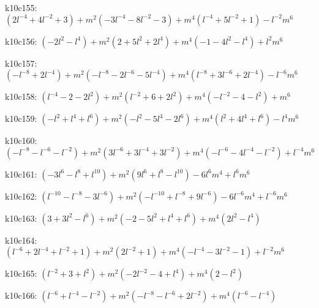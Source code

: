 k10c155: $ (2l^{-4}+4l^{-2}+3)  +m^{2}(-3l^{-4}-8l^{-2}-3)  +m^{4}(l^{-4}+5l^{-2}+1)  -l^{-2}m^{6} $ 

k10c156: $ (-2l^{2}-l^{4})  +m^{2}(2+5l^{2}+2l^{4})  +m^{4}(-1-4l^{2}-l^{4})  +l^{2}m^{6} $ 

k10c157: $ (-l^{-8}+2l^{-4})  +m^{2}(-l^{-8}-2l^{-6}-5l^{-4})  +m^{4}(l^{-8}+3l^{-6}+2l^{-4})  -l^{-6}m^{6} $ 

k10c158: $ (l^{-4}-2-2l^{2})  +m^{2}(l^{-2}+6+2l^{2})  +m^{4}(-l^{-2}-4-l^{2})  +m^{6} $ 

k10c159: $ (-l^{2}+l^{4}+l^{6})  +m^{2}(-l^{2}-5l^{4}-2l^{6})  +m^{4}(l^{2}+4l^{4}+l^{6})  -l^{4}m^{6} $ 

k10c160: $ (-l^{-8}-l^{-6}-l^{-2})  +m^{2}(3l^{-6}+3l^{-4}+3l^{-2})  +m^{4}(-l^{-6}-4l^{-4}-l^{-2})  +l^{-4}m^{6} $ 

k10c161: $ (-3l^{6}-l^{8}+l^{10})  +m^{2}(9l^{6}+l^{8}-l^{10})  -6l^{6}m^{4}  +l^{6}m^{6} $ 

k10c162: $ (l^{-10}-l^{-8}-3l^{-6})  +m^{2}(-l^{-10}+l^{-8}+9l^{-6})  -6l^{-6}m^{4}  +l^{-6}m^{6} $ 

k10c163: $ (3+3l^{2}-l^{6})  +m^{2}(-2-5l^{2}+l^{4}+l^{6})  +m^{4}(2l^{2}-l^{4}) $ 

k10c164: $ (l^{-6}+2l^{-4}+l^{-2}+1)  +m^{2}(2l^{-2}+1)  +m^{4}(-l^{-4}-3l^{-2}-1)  +l^{-2}m^{6} $ 

k10c165: $ (l^{-2}+3+l^{2})  +m^{2}(-2l^{-2}-4+l^{4})  +m^{4}(2-l^{2}) $ 

k10c166: $ (l^{-6}+l^{-4}-l^{-2})  +m^{2}(-l^{-8}-l^{-6}+2l^{-2})  +m^{4}(l^{-6}-l^{-4}) $ 

